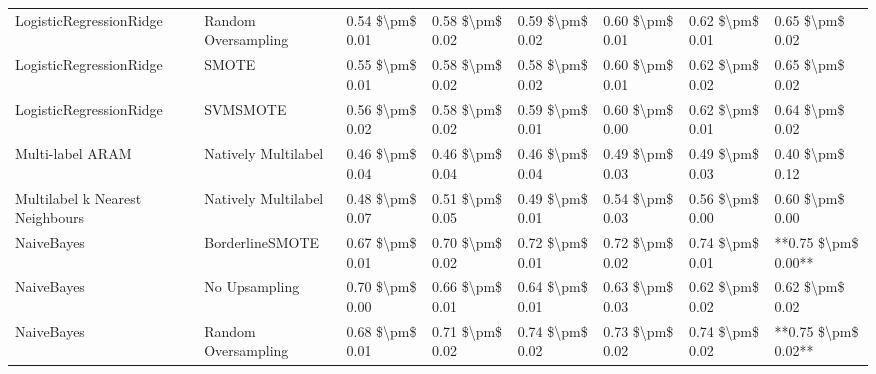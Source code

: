 \begin{tabular}{llllllll}
        LogisticRegressionRidge &           Random Oversampling &     0.54 \$\textbackslash pm\$ 0.01 &           0.58 \$\textbackslash pm\$ 0.02 &       0.59 \$\textbackslash pm\$ 0.02 &        0.60 \$\textbackslash pm\$ 0.01 &                         0.62 \$\textbackslash pm\$ 0.01 &     0.65 \$\textbackslash pm\$ 0.02 \\
        LogisticRegressionRidge &                         SMOTE &     0.55 \$\textbackslash pm\$ 0.01 &           0.58 \$\textbackslash pm\$ 0.02 &       0.58 \$\textbackslash pm\$ 0.02 &        0.60 \$\textbackslash pm\$ 0.01 &                         0.62 \$\textbackslash pm\$ 0.02 &     0.65 \$\textbackslash pm\$ 0.02 \\
        LogisticRegressionRidge &                      SVMSMOTE &     0.56 \$\textbackslash pm\$ 0.02 &           0.58 \$\textbackslash pm\$ 0.02 &       0.59 \$\textbackslash pm\$ 0.01 &        0.60 \$\textbackslash pm\$ 0.00 &                         0.62 \$\textbackslash pm\$ 0.01 &     0.64 \$\textbackslash pm\$ 0.02 \\
               Multi-label ARAM &           Natively Multilabel &     0.46 \$\textbackslash pm\$ 0.04 &           0.46 \$\textbackslash pm\$ 0.04 &       0.46 \$\textbackslash pm\$ 0.04 &        0.49 \$\textbackslash pm\$ 0.03 &                         0.49 \$\textbackslash pm\$ 0.03 &     0.40 \$\textbackslash pm\$ 0.12 \\
Multilabel k Nearest Neighbours &           Natively Multilabel &     0.48 \$\textbackslash pm\$ 0.07 &           0.51 \$\textbackslash pm\$ 0.05 &       0.49 \$\textbackslash pm\$ 0.01 &        0.54 \$\textbackslash pm\$ 0.03 &                         0.56 \$\textbackslash pm\$ 0.00 &     0.60 \$\textbackslash pm\$ 0.00 \\
                     NaiveBayes &               BorderlineSMOTE &     0.67 \$\textbackslash pm\$ 0.01 &           0.70 \$\textbackslash pm\$ 0.02 &       0.72 \$\textbackslash pm\$ 0.01 &        0.72 \$\textbackslash pm\$ 0.02 &                         0.74 \$\textbackslash pm\$ 0.01 & **0.75 \$\textbackslash pm\$ 0.00** \\
                     NaiveBayes &                 No Upsampling &     0.70 \$\textbackslash pm\$ 0.00 &           0.66 \$\textbackslash pm\$ 0.01 &       0.64 \$\textbackslash pm\$ 0.01 &        0.63 \$\textbackslash pm\$ 0.03 &                         0.62 \$\textbackslash pm\$ 0.02 &     0.62 \$\textbackslash pm\$ 0.02 \\
                     NaiveBayes &           Random Oversampling &     0.68 \$\textbackslash pm\$ 0.01 &           0.71 \$\textbackslash pm\$ 0.02 &       0.74 \$\textbackslash pm\$ 0.02 &        0.73 \$\textbackslash pm\$ 0.02 &                         0.74 \$\textbackslash pm\$ 0.02 & **0.75 \$\textbackslash pm\$ 0.02** \\

\end{tabular}

